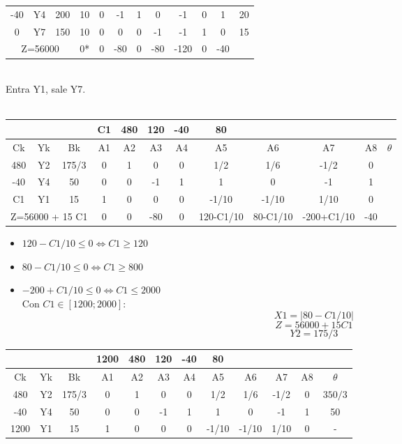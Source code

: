\documentclass{article}
\begin{document}
\begin{enumerate}
\begin{tabular}{|c  c  c | c  c  c  c  c  c  c  c | c |}
			 -40 & Y4 & 200 & 10 & 0 & -1 & 1 & 0 & -1 & 0 & 1 & 20\\
			 0 & Y7 & 150 & 10 & 0 & 0 & 0 & -1 & -1 & 1 & 0 & 15\\ \hline
			 \multicolumn{3}{|c|}{Z=56000} & 0* & 0 & -80 & 0 & -80 & -120 & 0 & -40 &\\ \hline
		\end{tabular}
		\medskip\\
		Entra Y1, sale Y7.\\ 
		\smallskip\\
		\begin{tabular}{|c  c  c | c  c  c  c  c  c  c  c | c |}
			\hline
			 \multicolumn{3}{|c|}{} & C1 & 480 & 120 & -40 & 80 & & & &\\ \hline
			 Ck & Yk & Bk & A1 & A2 & A3 & A4 & A5 & A6 & A7 & A8 & $\theta$\\ \hline 
			 480 & Y2 & 175/3 & 0 & 1 & 0 & 0 & 1/2 & 1/6 & -1/2 & 0 & \\
			 -40 & Y4 & 50 & 0 & 0 & -1 & 1 & 1 & 0 & -1 & 1 & \\
			 C1 & Y1 & 15 & 1 & 0 & 0 & 0 & -1/10 & -1/10 & 1/10 & 0 & \\ \hline
			 \multicolumn{3}{|c|}{Z=56000 + 15 C1} & 0 & 0 & -80 & 0 & 120-C1/10 & 80-C1/10 & -200+C1/10 & -40 &\\ \hline
		\end{tabular}
		\begin{itemize}
				\item $120 - C1/10 \leq 0 \iff C1 \geq 120$
				\item $80 - C1/10 \leq 0 \iff C1 \geq 800$
				\item $-200 + C1/10 \leq 0 \iff C1 \leq 2000$
					\smallskip\\
					Con $C1 \in [1200; 2000]$:\\
					$$X1 = |80 - C1/10|$$
					$$Z = 56000 + 15 C1$$
					$$Y2 = 175/3$$
		\end{itemize}
		\begin{tabular}{|c  c  c | c  c  c  c  c  c  c  c | c |}
			\hline
			 \multicolumn{3}{|c|}{} & 1200 & 480 & 120 & -40 & 80 & & & &\\ \hline
			 Ck & Yk & Bk & A1 & A2 & A3 & A4 & A5 & A6 & A7 & A8 & $\theta$\\ \hline 
			 480 & Y2 & 175/3 & 0 & 1 & 0 & 0 & 1/2 & 1/6 & -1/2 & 0 & $350/3$\\
			 -40 & Y4 & 50 & 0 & 0 & -1 & 1 & 1 & 0 & -1 & 1 & 50\\
			 1200 & Y1 & 15 & 1 & 0 & 0 & 0 & -1/10 & -1/10 & 1/10 & 0 & -\\ \hline

\end{tabular}
\end{enumerate}
\end{document}
